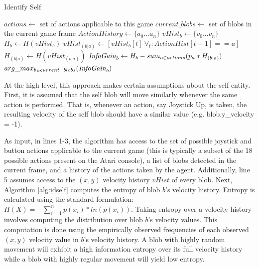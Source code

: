 \documentclass{sig-alternate}
\begin{document}
\begin{algorithm}
\caption{Identify Self}
\label{alg:idself}
\begin{algorithmic}[1]
  \STATE $actions \leftarrow $ set of actions applicable to this game
  \STATE $current\_blobs \leftarrow $ set of blobs in the current game frame
  \STATE $ActionHistory \leftarrow \{a_0...a_n\}$ %
  \STATE $vHist_b \leftarrow \{v_0...v_n\}$ %
  \STATE $H_b \leftarrow H(vHist_b)$ 
  \STATE $vHist_{(b|a)} \leftarrow [vHist_b[t] ~\forall_t: ActionHist[t-1] == a]$ 
  \STATE $H_{(b|a)} \leftarrow H(vHist_{(b|a)})$ %
  \ENDFOR
  \STATE $\textrm{\emph{InfoGain}}_b \leftarrow H_b - sum_{a \in actions}(p_a * H_{(b|a)})$ %
  \ENDFOR
  \RETURN $arg\_max_{b \in current\_blobs}(\textrm{\emph{InfoGain}}_b)$ %
\end{algorithmic}
\end{algorithm}

At the high level, this approach makes certain assumptions about the self entity. First, it is assumed that the self blob will move similarly whenever the same action is performed. That is, whenever an action, say Joystick Up, is taken, the resulting velocity of the self blob should have a similar value (e.g. blob.y\_velocity = -1). 

As input, in lines 1-3, the algorithm has access to the set of possible joystick and button actions applicable to the current game (this is typically a subset of the 18 possible actions present on the Atari console), a list of blobs detected in the current frame, and a history of the actions taken by the agent. Additionally, line 5 assumes access to the $(x,y)$ velocity history $vHist$ of every blob. Next, Algorithm \ref{alg:idself} computes the entropy of blob $b$'s velocity history. Entropy is calculated using the standard formulation: $H(X) = -\sum_{i=1}^n{p(x_i)*ln(p(x_i))}$. Taking entropy over a velocity history involves computing the distribution over blob $b$'s velocity values. This computation is done using the empirically observed frequencies of each observed $(x,y)$ velocity value in $b$'s velocity history. A blob with highly random movement will exhibit a high information entropy over its full velocity history while a blob with highly regular movement will yield low entropy.
\end{document}
